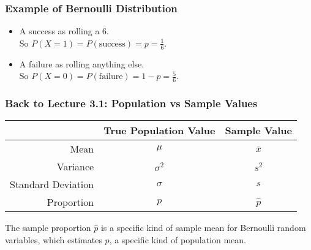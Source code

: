 \documentclass[handout]{beamer}
\newcommand{\blue}[1]{\textcolor{blue2}{#1}}
\begin{document}
\begin{frame}[fragile]
\frametitle{Example of Bernoulli Distribution}

\begin{itemize}
\pause\item A success as rolling a 6.\\
So $P(X=1) = P(\mbox{success}) = p =  \frac{1}{6}$.
\pause\item A failure as rolling anything else.\\
So $P(X=0) = P(\mbox{failure}) = 1-p = \frac{5}{6}$.
\end{itemize}

\end{frame}


\begin{frame}[fragile]
\frametitle{Back to Lecture 3.1: Population vs Sample Values}

\begin{center}
  \begin{tabular}{r|cc}
	\hline	
     & True Population Value & Sample Value \\ 
	\hline	
    Mean & $\mu$ & $\overline{x}$ \\ 
    Variance & $\sigma^2$ & $s^2$ \\ 
    Standard Deviation & $\sigma$ & $s$ \\ 
    \blue{Proportion} & \blue{$p$} & \blue{$\widehat{p}$} \\
	\hline	
  \end{tabular}
\end{center}

\vspace{0.5cm}

\pause The \blue{sample proportion $\widehat{p}$} is a specific kind of \blue{sample mean} for Bernoulli random variables, which \blue{estimates $p$}, a specific kind of population mean.  

\end{frame}
\end{document}
